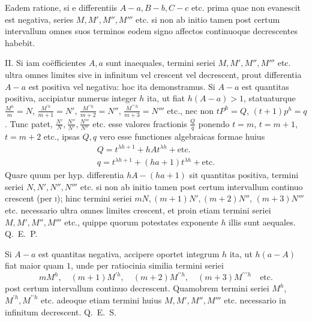 Eadem ratione, si e differentiis $A-a,B-b,C-c$ etc. prima quae non evanescit est negativa, series $M,M',M'',M'''$ etc. si non ab initio tamen post certum intervallum omnes suos terminos eodem signo affectos continuoque decrescentes habebit.

II. Si iam co\"efficientes $A,a$ sunt inaequales, termini seriei $M,M',M'',M'''$ etc. ultra omnes limites sive in infinitum vel crescent vel decrescent, prout differentia $A-a$ est positiva vel negativa: hoc ita demonstramus. Si $A-a$ est quantitas positiva, accipiatur numerus integer $h$ ita, ut fiat $h(A-a)>1$, statuaturque $\frac{M^h}{m}=N$, $\frac{M^{\prime h}}{m+1}=N'$, $\frac{M^{\prime\prime h}}{m+2}=N''$, $\frac{M^{\prime\prime\prime h}}{m+3}=N'''$ etc., nec non $tP^h=Q$, $(t+1)p^h=q$. Tunc patet, $\frac{N'}{N},\frac{N''}{N'},\frac{N'''}{N''}$ etc. esse valores fractionis $\frac{Q}{q}$ ponendo $t=m$, $t=m+1$, $t=m+2$ etc., ipsas $Q,q$ vero esse functiones algebraicas formae huius
\[
\begin{array}{l}
Q=t^{\lambda h+1}+hAt^{\lambda h}+\mathrm{etc.}\\
q=t^{\lambda h+1}+(ha+1)t^{\lambda h}+\mathrm{etc.}
\end{array}
\]
Quare quum per hyp. differentia $hA-(ha+1)$ sit quantitas positiva, termini seriei $N,N',N'',N'''$ etc. si non ab initio tamen post certum intervallum continuo crescent (per \textsc{i}); hinc termini seriei $mN,(m+1)N',(m+2)N''$, $(m+3)N'''$ etc. necessario ultra omnes limites crescent, et proin etiam termini seriei $M,M',M'',M'''$ etc., quippe quorum potestates exponente $h$ illis sunt aequales. Q.~E.~P.

Si $A-a$ est quantitas negativa, accipere oportet integrum $h$ ita, ut $h(a-A)$ fiat maior quam $1$, unde per ratiocinia similia termini seriei
\[
mM^h,\quad (m+1)M^{\prime h},\quad (m+2)M^{\prime\prime h},\quad (m+3)M^{\prime\prime\prime h}\quad\mathrm{etc.}
\]
post certum intervallum continuo decrescent. Quamobrem termini seriei $M^h$, $M^{\prime h},M^{\prime\prime h}$ etc. adeoque etiam termini huius $M,M',M'',M'''$ etc. necessario in infinitum decrescent. Q.~E.~S.

